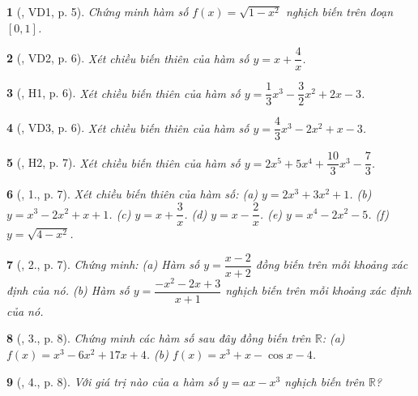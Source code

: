 \documentclass{article}
\newtheorem{baitoan}{}
\begin{document}
\begin{baitoan}[\cite{SGK_Toan_12_giai_tich_nang_cao}, VD1, p. 5]
	Chứng minh hàm số $f(x) = \sqrt{1 - x^2}$ nghịch biến trên đoạn $[0,1]$.
\end{baitoan}

\begin{baitoan}[\cite{SGK_Toan_12_giai_tich_nang_cao}, VD2, p. 6]
	Xét chiều biến thiên của hàm số $y = x + \dfrac{4}{x}$.
\end{baitoan}

\begin{baitoan}[\cite{SGK_Toan_12_giai_tich_nang_cao}, H1, p. 6]
	Xét chiều biến thiên của hàm số $y = \dfrac{1}{3}x^3 - \dfrac{3}{2}x^2 + 2x - 3$.
\end{baitoan}

\begin{baitoan}[\cite{SGK_Toan_12_giai_tich_nang_cao}, VD3, p. 6]
	Xét chiều biến thiên của hàm số $y = \dfrac{4}{3}x^3 - 2x^2 + x - 3$.
\end{baitoan}

\begin{baitoan}[\cite{SGK_Toan_12_giai_tich_nang_cao}, H2, p. 7]
	Xét chiều biến thiên của hàm số $y = 2x^5 + 5x^4 + \dfrac{10}{3}x^3 - \dfrac{7}{3}$.
\end{baitoan}

\begin{baitoan}[\cite{SGK_Toan_12_giai_tich_nang_cao}, 1., p. 7]
	Xét chiều biến thiên của hàm số: (a) $y = 2x^3 + 3x^2 + 1$. (b) $y = x^3 - 2x^2 + x + 1$. (c) $y = x + \dfrac{3}{x}$. (d) $y = x - \dfrac{2}{x}$. (e) $y = x^4 - 2x^2 - 5$. (f) $y = \sqrt{4 - x^2}$.
\end{baitoan}

\begin{baitoan}[\cite{SGK_Toan_12_giai_tich_nang_cao}, 2., p. 7]
	Chứng minh: (a) Hàm số $y = \dfrac{x - 2}{x + 2}$ đồng biến trên mỗi khoảng xác định của nó. (b) Hàm số $y = \dfrac{-x^2 - 2x + 3}{x + 1}$ nghịch biến trên mỗi khoảng xác định của nó.
\end{baitoan}

\begin{baitoan}[\cite{SGK_Toan_12_giai_tich_nang_cao}, 3., p. 8]
	Chứng minh các hàm số sau đây đồng biến trên $\mathbb{R}$: (a) $f(x) = x^3 - 6x^2 + 17x + 4$. (b) $f(x) = x^3 + x - \cos x - 4$.
\end{baitoan}

\begin{baitoan}[\cite{SGK_Toan_12_giai_tich_nang_cao}, 4., p. 8]
	Với giá trị nào của $a$ hàm số $y = ax - x^3$ nghịch biến trên $\mathbb{R}$?
\end{baitoan}
\end{document}
